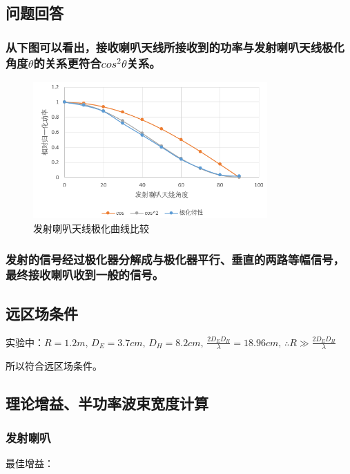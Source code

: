 \documentclass{../source/Experiment}
\begin{document}
        \subsection{问题回答}
            \subsubsection{从下图可以看出，接收喇叭天线所接收到的功率与发射喇叭天线极化角度$\theta$的关系更符合$cos^2 \theta$关系。}

            \begin{figure}[H]
                \centering
                \includegraphics[width = 0.8\textwidth]{pic/发射喇叭天线极化曲线比较.png}
                \caption{发射喇叭天线极化曲线比较}
            \end{figure}

            \subsubsection{发射的信号经过极化器分解成与极化器平行、垂直的两路等幅信号，最终接收喇叭收到一般的信号。
            }

        \subsection{远区场条件}

        实验中：$R = 1.2m, \, D_E = 3.7cm, \, D_H = 8.2cm, \, \displaystyle \frac{2 D_E D_H}{\lambda} = 18.96cm, \,  \therefore   R \gg  \displaystyle \frac{2 D_E D_H}{\lambda} $

        所以符合远区场条件。

        \subsection{理论增益、半功率波束宽度计算}
            \subsubsection{发射喇叭}
            最佳增益：
            
\end{document}
